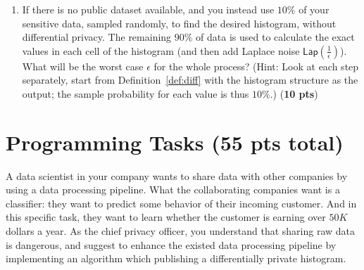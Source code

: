 \documentclass{article}
\begin{document}
\begin{enumerate}
	\item If there is no public dataset available, and you instead use $10\%$ of your sensitive data, sampled randomly, to find the desired histogram, without differential privacy.  The remaining $90\%$ of data is used to calculate the exact values in each cell of the histogram (and then add Laplace noise $\mathsf{Lap}\left(\frac{1}{\epsilon}\right)$).  What will be the worst case  $\epsilon$ for the whole process? (Hint: Look at each step separately, start from Definition~\ref{def:diff} with the histogram structure as the output; the sample probability for each value is thus $10\%$.) (\textbf{10 pts})
	
\end{enumerate}

%
%


\section{Programming Tasks (55 pts total)}

A data scientist in your company wants to share data with other companies by using a data processing pipeline. What the collaborating companies want is a classifier: they want to predict some behavior of their incoming customer.  And in this specific task, they want to learn whether the customer is earning over $50K$ dollars a year. As the chief privacy officer, you understand that sharing raw data is dangerous, and suggest to enhance the existed data processing pipeline by implementing an algorithm which publishing a differentially private histogram.

\end{document}
